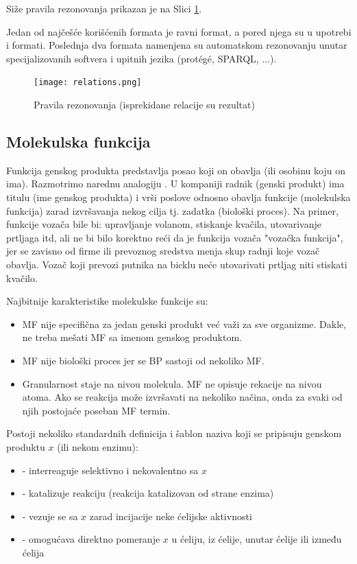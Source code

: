 Siže pravila rezonovanja prikazan je na Slici \ref{fig:relations}.

Jedan od najčešće korišćenih formata je  ravni  format, a pored njega
su u upotrebi  i  formati.  Poslednja dva formata
namenjena su automatskom rezonovanju unutar specijalizovanih softvera i upitnih
jezika (protégé, SPARQL, ...).

\begin{figure}[h!]
  \centering
  \texttt{[image: relations.png]}
  \caption{Pravila rezonovanja (isprekidane relacije su rezultat)}
  \label{fig:relations}
\end{figure}


\subsection{Molekulska funkcija}
\label{MF}

Funkcija genskog produkta predstavlja posao koji on obavlja (ili osobinu koju on ima).
Razmotrimo narednu analogiju \parencite{go_mf}.  U kompaniji radnik (genski produkt) ima titulu
(ime genskog produkta) i vrši poslove odnosno obavlja funkcije (molekulska
funkcija) zarad izvršavanja nekog cilja tj. zadatka (biološki proces). Na
primer, funkcije vozača bile bi: upravljanje volanom, stiskanje kvačila,
utovarivanje prtljaga itd, ali ne bi bilo korektno reći da je funkcija vozača
"vozačka funkcija", jer se zavisno od firme ili prevoznog sredstva menja skup
radnji koje vozač obavlja.  Vozač koji prevozi putnika na bicklu neće
utovarivati prtljag niti stiskati kvačilo.

Najbitnije karakteristike molekulske funkcije su:\parencite{go_mf}
\begin{itemize}
  \item MF nije specifična za jedan genski produkt već važi za sve organizme. Dakle, ne treba mešati MF sa imenom genskog produktom.
  \item MF nije biološki proces jer se BP sastoji od nekoliko MF.
  \item Granularnost staje na nivou molekula. MF ne opisuje rekacije na nivou
    atoma. Ako se reakcija može izvršavati na nekoliko načina, onda za svaki od njih
    postojaće poseban MF termin.
\end{itemize}

Postoji nekoliko standardnih definicija i šablon naziva koji se pripisuju genskom
produktu $x$ (ili nekom enzimu): \parencite{go_mf}
\begin{itemize}
  \item {} - interreaguje selektivno i nekovalentno sa $x$
  \item {} - katalizuje reakciju (reakcija katalizovan od strane enzima)
  \item {} - vezuje se sa $x$ zarad incijacije neke ćelijske aktivnosti
  \item {} - omogućava direktno pomeranje $x$ u ćeliju, iz ćelije, unutar ćelije ili između ćelija
\end{itemize}

